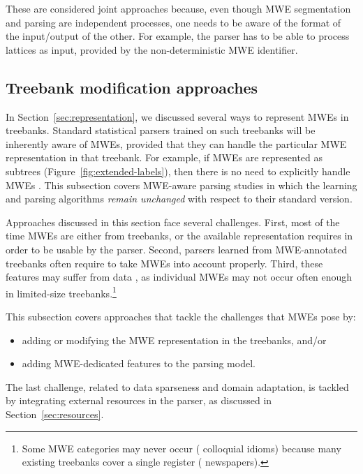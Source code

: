 \documentclass[output=paper]{LSP/langsci}
\begin{document}
These are considered joint approaches because, even though MWE segmentation and parsing are independent processes, one needs to be aware of the format of the input/output of the other.
For example, the parser has to be able to process lattices as input, provided by the non-deterministic MWE identifier.





\subsection{Treebank modification approaches}
\label{ssec:joint:data}

In Section~\ref{sec:representation}, we discussed several ways to represent MWEs in treebanks.
Standard statistical parsers trained on such treebanks will be inherently aware of MWEs, provided that they can handle the particular MWE representation in that treebank.
For example, if MWEs are represented as subtrees (Figure~\ref{fig:extended-labels}), then there is no need to explicitly handle MWEs \citep{nivre16}.
This subsection covers MWE-aware parsing studies   in which the learning and parsing algorithms \emph{remain unchanged} with respect to their standard version.

Approaches discussed in this section face several challenges.
First, most of the time MWEs are either  from treebanks, or the available representation requires  in order to be usable by the parser.
Second, parsers learned from MWE-annotated treebanks often require  to take MWEs into account properly. Third, these features may suffer from data , as individual MWEs may not occur often enough in limited-size treebanks.\footnote{
Some MWE categories may never occur (\eg{} colloquial idioms) because many existing treebanks cover a single register (\eg{} newspapers).}

This subsection covers approaches that tackle the challenges that MWEs pose by:
\begin{itemize}
 \item adding or modifying the MWE representation in the treebanks, and/or
 \item adding MWE-dedicated features to the parsing model.
\end{itemize}
The last challenge, related to data sparseness and domain adaptation, is tackled by integrating external resources in the parser, as discussed in Section~\ref{sec:resources}.
\end{document}

